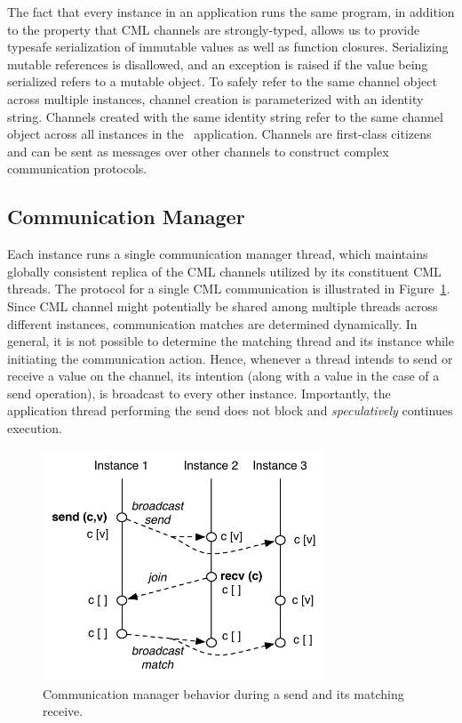 The fact that every instance in an \rxcml application runs the same program, in
addition to the property that CML channels are strongly-typed, allows us to
provide typesafe serialization of immutable values as well as function
closures. Serializing mutable references is disallowed, and an exception is
raised if the value being serialized refers to a mutable object. To safely
refer to the same channel object across multiple instances, channel creation is
parameterized with an identity string. Channels created with the same identity
string refer to the same channel object across all instances in the \rxcml\
application. Channels are first-class citizens and can be sent as messages over
other channels to construct complex communication protocols.

\subsection{Communication Manager}
\label{sec:comm_mgr}

Each \rxcml instance runs a single communication manager thread, which
maintains globally consistent replica of the CML channels utilized by its
constituent CML threads. The protocol for a single CML communication is
illustrated in Figure~\ref{fig:comm_mgr}. Since CML channel might potentially
be shared among multiple threads across different instances, communication
matches are determined dynamically. In general, it is not possible to determine
the matching thread and its instance while initiating the communication action.
Hence, whenever a thread intends to send or receive a value on the channel, its
intention (along with a value in the case of a send operation), is broadcast to
every other \rxcml instance. Importantly, the application thread performing the
send does not block and \emph{speculatively} continues execution.

\begin{figure}
\centering
\includegraphics[width=0.75\textwidth]{Figures/CommunicationManager}
\caption{Communication manager behavior during a send and its matching receive.}
\label{fig:comm_mgr}
\end{figure}

